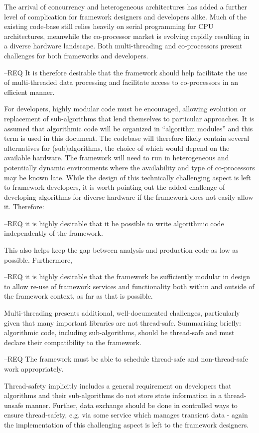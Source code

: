 \documentclass[../main-v1.tex]{subfiles}
\begin{document}
The arrival of concurrency and heterogeneous architectures has added a further level of complication for framework designers and developers alike.  Much of the existing code-base still relies heavily on serial programming for CPU architectures, meanwhile the co-processor market is evolving rapidly resulting in a diverse hardware landscape.  Both multi-threading and co-processors present challenges for both frameworks and developers.  

--REQ It is therefore desirable that the framework should help facilitate the use of multi-threaded data processing and facilitate access to co-processors in an efficient manner. 

For developers, highly modular code must be encouraged, allowing evolution or replacement of sub-algorithms that lend themselves to particular approaches.  It is assumed that algorithmic code will be organized in “algorithm modules” and this term is used in this document.  The codebase will therefore likely contain several alternatives for (sub)algorithms, the choice of which would depend on the available hardware.  The framework will need to run in heterogeneous and potentially dynamic environments where the availability and type of co-processors may be known late.  While the design of this technically challenging aspect is left to framework developers, it is worth pointing out the added challenge of developing algorithms for diverse hardware if the framework does not easily allow it.  Therefore:

--REQ it is highly desirable that it be possible to write algorithmic code independently of the framework.

This also helps keep the gap between analysis and production code as low as possible.  Furthermore, 

--REQ it is highly desirable that the framework be sufficiently modular in design to allow re-use of framework services and functionality both within and outside of the framework context, as far as that is possible.

Multi-threading presents additional, well-documented challenges, particularly given that many important libraries are not thread-safe.  Summarising briefly: algorithmic code, including sub-algorithms, should be thread-safe and must declare their compatibility to the framework.

--REQ The framework must be able to schedule thread-safe and non-thread-safe work appropriately.  

Thread-safety implicitly includes a general requirement on developers that algorithms and their sub-algorithms do not store state information in a thread-unsafe manner.  Further, data exchange should be done in controlled ways to ensure thread-safety, e.g. via some service which manages transient data - again the implementation of this challenging aspect is left to the framework designers.
\end{document}
